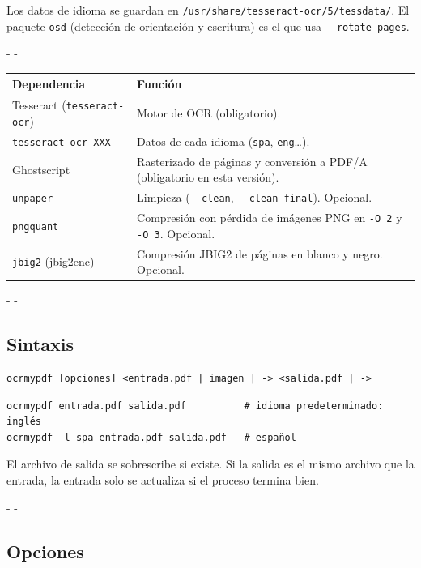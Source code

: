 \documentclass[11pt,a4paper]{article}
\makeatletter
\newcommand{\necesitaespacio}[1]{\par\penalty-100\begingroup
	\setlength{\dimen@}{#1}\dimen@ii\pagegoal\advance\dimen@ii-\pagetotal
	\ifdim\dimen@>\dimen@ii\ifdim\dimen@ii>\z@\vfil\fi\penalty-\@M\fi\endgroup}
\newcommand{\opt}[1]{\texttt{\textcolor{colopt}{#1}}}      %
\newcommand{\arch}[1]{\texttt{\textcolor{colarch}{#1}}}    %
\newcommand{\cab}[1]{\textbf{#1}}
\makeatother
\begin{document}
	Los datos de idioma se guardan en \arch{/\allowbreak{}usr/\allowbreak{}share/\allowbreak{}tesseract-\allowbreak{}ocr/\allowbreak{}5/\allowbreak{}tessdata/}. El paquete \texttt{osd} (detección de orientación y escritura) es el que usa \opt{-{}-rotate-pages}.
	
	\begingroup\small
	\necesitaespacio{16\baselineskip}
	\begin{longtable}{L{3.4cm}L{11.66cm}}
		\toprule{}\cab{Dependencia} & \cab{Función}\\\midrule
		\endfirsthead
		\bottomrule
		\endfoot
		Tesseract (\texttt{tesseract-ocr}) & Motor de OCR (obligatorio).\\*
		\texttt{tesseract-\allowbreak{}ocr-\allowbreak{}XXX} & Datos de cada idioma (\texttt{spa}, \texttt{eng}\ldots).\\
		Ghostscript & Rasterizado de páginas y conversión a PDF/A (obligatorio en esta versión).\\
		\texttt{unpaper} & Limpieza (\opt{-{}-clean}, \opt{-{}-clean-final}). Opcional.\\
		\texttt{pngquant} & Compresión con pérdida de imágenes PNG en \opt{-O 2} y \opt{-O 3}. Opcional.\\*
		\texttt{jbig2} (jbig2enc) & Compresión JBIG2 de páginas en blanco y negro. Opcional.\\
	\end{longtable}
	\endgroup
	
	\necesitaespacio{8\baselineskip}
	\subsection{Sintaxis}
	
	\begin{lstlisting}[style=sintaxis]
ocrmypdf [opciones] <entrada.pdf | imagen | -> <salida.pdf | ->
\end{lstlisting}
	
	\begin{lstlisting}
ocrmypdf entrada.pdf salida.pdf          # idioma predeterminado: inglés
ocrmypdf -l spa entrada.pdf salida.pdf   # español
\end{lstlisting}
	
	El archivo de salida se sobrescribe si existe. Si la salida es el mismo archivo que la entrada, la entrada solo se actualiza si el proceso termina bien.
	
	\necesitaespacio{27\baselineskip}
	\subsection{Opciones}
	
\end{document}
